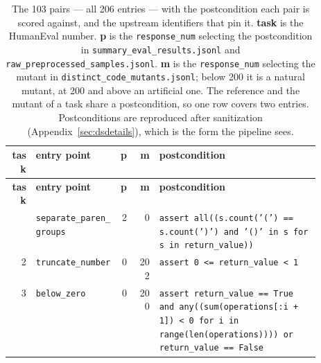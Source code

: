 
\begin{footnotesize}
\begin{longtable}{@{}r l r r p{0.52\linewidth}@{}}
\caption{The 103 pairs --- all 206 entries --- with the
postcondition each pair is scored against, and the upstream identifiers that pin
it. \textbf{task} is the HumanEval number. \textbf{p} is the
\texttt{response\_num} selecting the postcondition in
\texttt{summary\_eval\_results.jsonl} and
\texttt{raw\_preprocessed\_samples.jsonl}. \textbf{m} is the
\texttt{response\_num} selecting the mutant in
\texttt{distinct\_code\_mutants.jsonl}; below 200 it is a natural mutant, at
200 and above an artificial one. The reference and the mutant of a task share a
postcondition, so one row covers two entries. Postconditions are reproduced
after sanitization (Appendix~\ref{sec:dsdetails}), which is the form the
pipeline sees.}
\label{tab:specs} \\
\toprule
\textbf{task} & \textbf{entry point} & \textbf{p} & \textbf{m} & \textbf{postcondition} \\
\midrule
\endfirsthead
\toprule
\textbf{task} & \textbf{entry point} & \textbf{p} & \textbf{m} & \textbf{postcondition} \\
\midrule
\endhead
\bottomrule
\endfoot
1 & \texttt{separate\_paren\_groups} & 2 & 0 & \texttt{assert \allowbreak{}all(\allowbreak{}(\allowbreak{}s.\allowbreak{}count(\allowbreak{}'\allowbreak{}(\allowbreak{}'\allowbreak{})\allowbreak{} \allowbreak{}=\allowbreak{}=\allowbreak{} \allowbreak{}s.\allowbreak{}count(\allowbreak{}'\allowbreak{})\allowbreak{}'\allowbreak{})\allowbreak{} \allowbreak{}and \allowbreak{}'\allowbreak{}(\allowbreak{})\allowbreak{}'\allowbreak{} \allowbreak{}in \allowbreak{}s \allowbreak{}for \allowbreak{}s \allowbreak{}in \allowbreak{}return\_value)\allowbreak{})\allowbreak{}} \\
2 & \texttt{truncate\_number} & 0 & 202 & \texttt{assert \allowbreak{}0 \allowbreak{}<\allowbreak{}=\allowbreak{} \allowbreak{}return\_value \allowbreak{}<\allowbreak{} \allowbreak{}1} \\
3 & \texttt{below\_zero} & 0 & 200 & \texttt{assert \allowbreak{}return\_value \allowbreak{}=\allowbreak{}=\allowbreak{} \allowbreak{}True \allowbreak{}and \allowbreak{}any(\allowbreak{}(\allowbreak{}sum(\allowbreak{}operations[\allowbreak{}:\allowbreak{}i \allowbreak{}+\allowbreak{} \allowbreak{}1]\allowbreak{})\allowbreak{} \allowbreak{}<\allowbreak{} \allowbreak{}0 \allowbreak{}for \allowbreak{}i \allowbreak{}in \allowbreak{}range(\allowbreak{}len(\allowbreak{}operations)\allowbreak{})\allowbreak{})\allowbreak{})\allowbreak{} \allowbreak{}or \allowbreak{}return\_value \allowbreak{}=\allowbreak{}=\allowbreak{} \allowbreak{}False} \\

\end{longtable}
\end{footnotesize}
